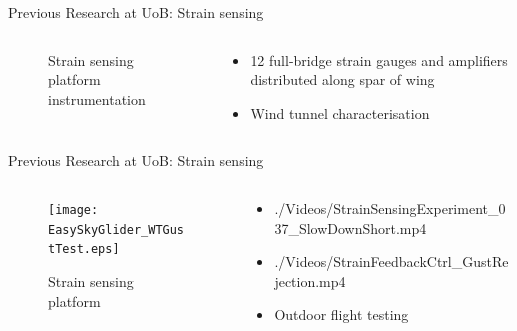 \documentclass[aspectratio=169]{beamer}            %
\begin{document}
\begin{frame}{Previous Research at UoB: Strain sensing}

  \begin{columns}
    \begin{column}{0.6\textwidth}
		  \begin{figure}[!htb]
	  		\centering
	  		
	  		\caption{Strain sensing platform instrumentation}
	  		\label{Fig:StrainExpPlatformInst}
			\end{figure}
		\end{column}
		\begin{column}{0.4\textwidth}
			\begin{itemize}
				\item<2-> 12 full-bridge strain gauges and amplifiers distributed along spar of wing
				\item<3-> Wind tunnel characterisation
			\end{itemize}
		\end{column}
	\end{columns}

\end{frame}

\begin{frame}{Previous Research at UoB: Strain sensing}

  \begin{columns}
    \begin{column}{0.6\textwidth}
			\begin{figure}[!htb]
	  		\centering
	  		\texttt{[image: EasySkyGlider\_WTGustTest.eps]}
	  		\caption{Strain sensing platform}
	  	  \label{Fig:StrainExpPlatform2}
			\end{figure}
		\end{column}
		\begin{column}{0.4\textwidth}
			\begin{itemize}
				\item<2-> {
					{./Videos/StrainSensingExperiment_037_SlowDownShort.mp4}}
				\item<3-> {
					{./Videos/StrainFeedbackCtrl_GustRejection.mp4}}
				\item<4-> Outdoor flight testing
			\end{itemize}
		\end{column}
	\end{columns}

\end{frame}
\end{document}
